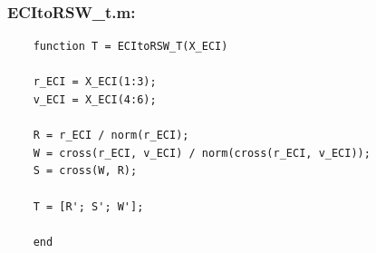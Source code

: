 \documentclass[conf]{new-aiaa}
\begin{document}
\subsubsection{ECItoRSW\_t.m:}
\begin{lstlisting}
	function T = ECItoRSW_T(X_ECI)
	
	r_ECI = X_ECI(1:3); 
	v_ECI = X_ECI(4:6); 
	
	R = r_ECI / norm(r_ECI); 
	W = cross(r_ECI, v_ECI) / norm(cross(r_ECI, v_ECI)); 
	S = cross(W, R); 
	
	T = [R'; S'; W']; 
	
	end 
\end{lstlisting}




\end{document}
